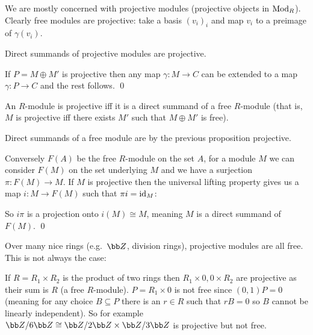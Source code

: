 \edefn

We are mostly concerned with {\emphcolor projective modules} (projective objects in ${\rm Mod}_R$).
Clearly free modules are projective: take a basis $(v_i)_i$ and map $v_i$ to a preimage of $\gamma(v_i)$.

\bprop

    Direct summands of projective modules are projective.

\eprop

\bproof

    If $P=M\oplus M'$ is projective then any map $\gamma\colon M\to C$ can be extended to a map $\gamma\colon P\to C$ and the rest follows.
    \qed

\eproof

\bprop

    An $R$-module is projective iff it is a direct summand of a free $R$-module (that is, $M$ is projective iff there exists $M'$ such that $M\oplus M'$ is free).

\eprop

\bproof

    Direct summands of a free module are by the previous proposition projective.

    Conversely $F(A)$ be the free $R$-module on the set $A$, for a module $M$ we can consider $F(M)$ on the set underlying $M$ and we have a surjection $\pi\colon F(M)\to M$.
    If $M$ is projective then the universal lifting property gives us a map $i\colon M\to F(M)$ such that $\pi i={\rm id}_M$:

    \centerline{}

    So $i\pi$ is a projection onto $i(M)\cong M$, meaning $M$ is a direct summand of $F(M)$.
    \qed

\eproof

Over many nice rings (e.g.\ $\bZ$, division rings), projective modules are all free.
This is not always the case:

\bexam

    If $R=R_1\times R_2$ is the product of two rings then $R_1\times0,0\times R_2$ are projective as their sum is $R$ (a free $R$-module).
    $P=R_1\times0$ is not free since $(0,1)P=0$ (meaning for any choice $B\subseteq P$ there is an $r\in R$ such that $rB=0$ so $B$ cannot be linearly independent).
    So for example $\bZ/6\bZ\cong\bZ/2\bZ\times\bZ/3\bZ$ is projective but not free.

